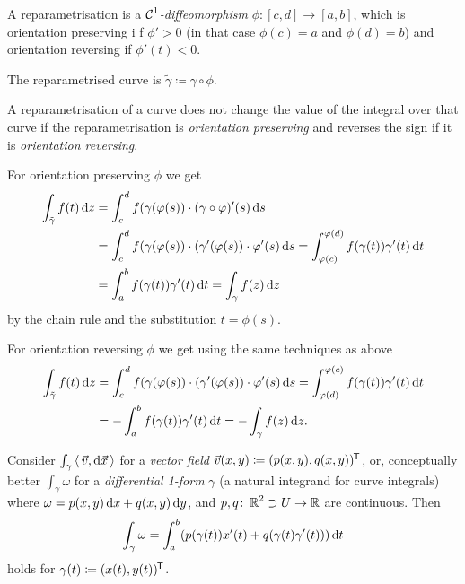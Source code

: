 \documentclass[a4paper,english]{article}
\begin{document}
\begin{defnA}[Reparametrisation]
    A reparametrisation is a \emph{$\operatorname{\mathcal{C}}^1$-diffeomorphism} $\phi\colon [c, d] \to [a, b]$, which is orientation preserving i
    f $\phi' > 0$ (in that case $\phi(c) = a$ and $\phi(d) = b$) and orientation reversing if $\phi'(t) < 0$.
    
    The reparametrised curve is $\tilde{\gamma} \coloneqq \gamma \circ \phi$.
\end{defnA}

\begin{lemma}
    A reparametrisation of a curve does not change the value of the integral over that curve if the reparametrisation is \emph{orientation preserving} and reverses the sign if it is \emph{orientation reversing}.
\end{lemma}

\begin{pr}
    For orientation preserving $\phi$ we get
    \begin{align*}
        \int_{\tilde{\gamma}} f(t) \mathop{}\!\mathrm{d}{z}
        & = \int_{c}^{d} f(\gamma(\varphi(s)) \cdot (\gamma \circ \varphi)'(s) \mathop{}\!\mathrm{d}{s} \\
        & = \int_{c}^{d} f(\gamma(\varphi(s)) \cdot (\gamma'(\varphi(s)) \cdot \varphi'(s) \mathop{}\!\mathrm{d}{s}
        = \int_{\varphi(c)}^{\varphi(d)} f(\gamma(t)) \gamma'(t) \mathop{}\!\mathrm{d}{t} \\
        & = \int_{a}^{b} f(\gamma(t)) \gamma'(t) \mathop{}\!\mathrm{d}{t}
        = \int_{\gamma} f(z) \mathop{}\!\mathrm{d}{z}
    \end{align*}
    by the chain rule and the substitution  $t = \phi(s)$.
    
    For orientation reversing $\phi$ we get using the same techniques as above
    \begin{align*}
        \int_{\tilde{\gamma}} f(t) \mathop{}\!\mathrm{d}{z}
        & = \int_{c}^{d} f(\gamma(\varphi(s)) \cdot (\gamma'(\varphi(s)) \cdot \varphi'(s) \mathop{}\!\mathrm{d}{s}
        = \int_{\varphi(d)}^{\varphi(c)} f(\gamma(t)) \gamma'(t) \mathop{}\!\mathrm{d}{t} \\
        & = -\int_{a}^{b} f(\gamma(t)) \gamma'(t) \mathop{}\!\mathrm{d}{t}
        = -\int_{\gamma} f(z) \mathop{}\!\mathrm{d}{z}.
    \end{align*}
\end{pr}

Consider $\int_{\gamma} \operatorname{\langle} \vec{v}, \mathop{}\!\mathrm{d} \vec{x} \operatorname{\rangle}$ for a \emph{vector field} $\vec{v}(x,y) \coloneqq ( p(x,y), q(x,y))^{\mkern-1.5mu\mathsf{T}}$, or, conceptually better $\int_{\gamma} \omega$ for a \emph{differential 1-form} $\gamma$ (a natural integrand for curve integrals) where $\omega = p(x, y) \mathop{}\!\mathrm{d}{x} + q(x, y) \mathop{}\!\mathrm{d}{y}$, and $p,q \colon \operatorname{\mathbb{R}}^2 \supset U \to \operatorname{\mathbb{R}}$ are continuous.
Then 
\begin{equation*}
    \int_{\gamma} \omega
    = \int_{a}^{b} ( p(\gamma(t)) x'(t) + q(\gamma(t) \gamma'(t))) \mathop{}\!\mathrm{d}{t}
\end{equation*}
holds for $\gamma(t) \coloneqq (x(t), y(t))^{\mkern-1.5mu\mathsf{T}}$.
\end{document}
